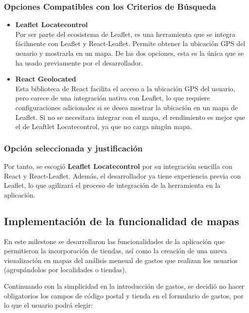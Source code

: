 \subsubsection{Opciones Compatibles con los Criterios de Búsqueda} 
\begin{itemize} 
    \item \textbf{Leaflet Locatecontrol}\\
    Por ser parte del ecosistema de Leaflet, es una herramienta que se integra fácilmente con Leaflet y React-Leaflet. Permite obtener la ubicación GPS del usuario y mostrarla en un mapa. De las dos opciones, esta es la única que se ha usado previamente por el desarrollador.
    \item \textbf{React Geolocated}\\
    Esta biblioteca de React facilita el acceso a la ubicación GPS del usuario, pero carece de una integración nativa con Leaflet, lo que requiere configuraciones adicionales si se desea mostrar la ubicación en un mapa de Leaflet. Si no se necesitara integrar con el mapa, el rendimiento es mejor que el de Leaftlet Locatecontrol, ya que no carga ningún mapa.
\end{itemize}

\subsubsection{Opción seleccionada y justificación}
Por tanto, se escogió \textbf{Leaflet Locatecontrol} por su integración sencilla con React y React-Leaflet. Además, el desarrollador ya tiene experiencia previa con Leaflet, lo que agilizará el proceso de integración de la herramienta en la aplicación\cite{leafletLocateControl2023}.





\subsection{Implementación de la funcionalidad de mapas}
En este milestone se desarrollaron las funcionalidades de la aplicación que permitieron la incorporación de tiendas, así como la creación de una nueva visualización en mapas del análisis mensual de gastos que realizan los usuarios (agrupándolos por localidades o tiendas).

Continuando con la simplicidad en la introducción de gastos, se decidió no hacer obligatorios los campos de código postal y tienda en el formulario de gastos, por lo que el usuario podrá elegir:

